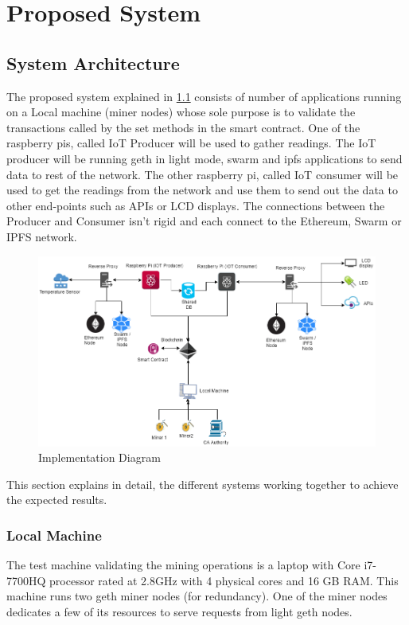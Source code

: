 \documentclass[11pt,openright]{report}
\begin{document}
\chapter{Proposed System} \label{chapter:proposed_system}

\section{System Architecture} \label{ss:construct_architecture}
The proposed system explained in \ref{fig:impldiagram_architechture} consists of number of applications running on a Local machine (miner nodes) whose sole purpose is to validate the transactions called by the set methods in the smart contract. One of the raspberry pis, called IoT Producer will be used to gather readings. The IoT producer will be running geth in light mode, swarm and ipfs applications to send data to rest of the network. The other raspberry pi, called IoT consumer will be used to get the readings from the network and use them to send out the data to other end-points such as APIs or LCD displays. The connections between the Producer and Consumer isn't rigid and each connect to the Ethereum, Swarm or IPFS network.

\begin{figure}
	\centering
	\includegraphics[scale=0.5]{images/Final_Implementationv2.png}
	\caption{Implementation Diagram}
	\label{fig:impldiagram_architechture}
\end{figure}


This section explains in detail, the different systems working together to achieve the expected results.

\subsection{Local Machine}
The test machine validating the mining operations is a laptop with Core i7-7700HQ processor rated at 2.8GHz with 4 physical cores and 16 GB RAM. This machine runs two geth miner nodes (for redundancy). One of the miner nodes dedicates a few of its resources to serve requests from light geth nodes.
\end{document}
